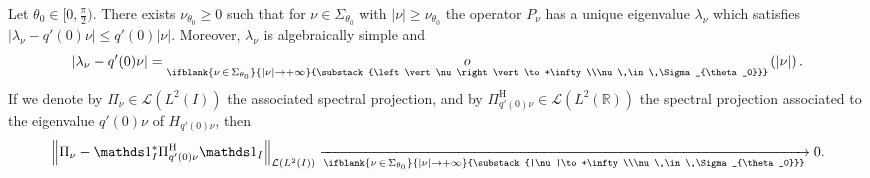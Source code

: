 \documentclass[10pt]{amsart}
\theoremstyle{definition}\newtheorem{defi}[theo]{Definition}\newtheorem{rema}[theo]{Remark}\newtheorem{exam}[theo]{Example}\newtheorem{exem}[theo]{Example}\newtheorem{nota}[theo]{Notation}
\newcommand{\abs}[1]{\left\vert #1\right\vert}
\renewcommand{\leq}{\leqslant}
\renewcommand{\geq}{\geqslant}
\newcommand{\littleo}[3][]{\mathop{o}\limits_{\ifblank{#1}{#2 \to #3}{\substack{#2\to #3\\#1}}}}
\newcommand{\1}{\mathds 1}
\newcommand{\limt}[3][]{\xrightarrow[\ifblank{#1}{#2 \to #3}{\substack{#2\to #3\\#1}}]{}}
\newcommand{\R}{\mathbb{R}}
\newcommand{\Lc}{{\mathcal L}}
\newcommand{\sector}[1][\theta_0]{\Sigma_{#1}}
\newcommand{\h}{{\mathrm{H}}}
\renewcommand{\th}{\theta}
\renewcommand{\l}{\lambda}
\begin{document}
\begin{prop}\label{prop-lambda-n}
Let $\th_0 \in [0,\frac \pi 2)$. There exists $\nu_{\theta_0} \geq 0$ such that for $\nu \in \sector$ with $\abs \nu \geq \nu_{\theta_0}$ the operator $P_\nu$ has a unique eigenvalue $\lambda_\nu$ which satisfies $\abs{\lambda_\nu - q'(0)\nu} \leq q'(0) \abs \nu$. Moreover, $\lambda_\nu$ is algebraically simple and
\[
\abs{\l_\nu - q'(0) \nu} = \littleo[\nu\,\in\,\sector]{\abs \nu} {+\infty} \left(\abs \nu \right).
\]
If we denote by $\Pi_\nu \in \Lc(L^2(I))$ the associated spectral projection, and by $\Pi^\h_{q'(0)\nu} \in \Lc(L^2(\R))$ the spectral projection associated to the eigenvalue $q'(0)\nu$ of $H_{q'(0)\nu}$, then
\[
\left\|\Pi_\nu - \1_I^* \Pi^\h_{q'(0)\nu}\1_I\right\|_{\Lc\left(L^2(I)\right)} \limt[\nu\,\in\,\sector]{|\nu|}{+\infty} 0.
\]
\end{prop}
\end{document}
